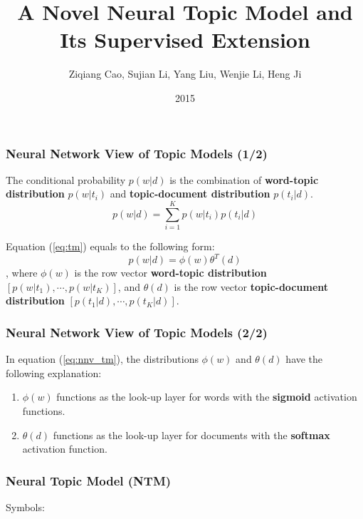 \documentclass{beamer}
\begin{document}
\title{A Novel Neural Topic Model and Its Supervised Extension}
\author{Ziqiang Cao, Sujian Li, Yang Liu, Wenjie Li, Heng Ji}
\date{2015}
\maketitle

\begin{frame}
\frametitle{Neural Network View of Topic Models (1/2)}

The conditional probability \(p(w|d)\) is the combination of \textbf{word-topic distribution} \(p(w|t_i)\) and \textbf{topic-document distribution} \(p(t_i|d)\).
\begin{equation}
\label{eq:tm}
	p(w|d)=\sum_{i=1}^{K} p(w|t_i)p(t_i|d)
\end{equation}

Equation (\ref{eq:tm}) equals to the following form:
\begin{equation}
\label{eq:nnv_tm}
p(w|d)=\phi(w) \theta^T(d)
\end{equation}
, where \(\phi(w)\) is the row vector \textbf{word-topic distribution} \([p(w|t_1), \cdots, p(w|t_K)]\), and \(\theta(d)\) is the row vector \textbf{topic-document distribution} \([p(t_1|d), \cdots, p(t_K|d)]\).

\end{frame}

\begin{frame}
\frametitle{Neural Network View of Topic Models (2/2)}

In equation (\ref{eq:nnv_tm}), the distributions \(\phi(w)\) and \(\theta(d)\) have the following explanation:
\begin{enumerate}
	\item \(\phi(w)\) functions as the look-up layer for words with the \textbf{sigmoid} activation functions.
	\item \(\theta(d)\) functions as the look-up layer for documents with the \textbf{softmax} activation function. 
\end{enumerate}	

\end{frame}

\begin{frame}
\frametitle{Neural Topic Model (NTM)}	
Symbols:

\end{frame}
\end{document}
